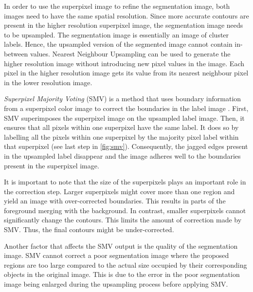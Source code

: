 In order to use the superpixel image to refine the segmentation image, both images need to have the same spatial resolution. Since more accurate contours are present in the higher resolution superpixel image, the segmentation image needs to be upsampled. The segmentation image is essentially an image of cluster labels. Hence, the upsampled version of the segmented image cannot contain in-between values. Nearest Neighbour Upsampling can be used to generate the higher resolution image without introducing new pixel values in the image. Each pixel in the higher resolution image gets its value from its nearest neighbour pixel in the lower resolution image.

\emph{Superpixel Majority Voting} (SMV) is a method that uses boundary information from a superpixel color image to correct the boundaries in the label image \parencite{feng2021superpixel}. First, SMV superimposes the superpixel image on the upsampled label image. Then, it ensures that all pixels within one superpixel have the same label. It does so by labelling all the pixels within one superpixel by the majority pixel label within that superpixel (see last step in \autoref{fig:smv}). Consequently, the jagged edges present in the upsampled label disappear and the image adheres well to the boundaries present in the superpixel image.

It is important to note that the size of the superpixels plays an important role in the correction step. Larger superpixels might cover more than one region and yield an image with over-corrected boundaries. This results in parts of the foreground merging with the background. In contrast, smaller superpixels cannot significantly change the contours. This limits the amount of correction made by SMV. Thus, the final contours might be under-corrected.

Another factor that affects the SMV output is the quality of the segmentation image. SMV cannot correct a poor segmentation image where the proposed regions are too large compared to the actual size occupied by their corresponding objects in the original image. This is due to the error in the poor segmentation image being enlarged during the upsampling process before applying SMV.

